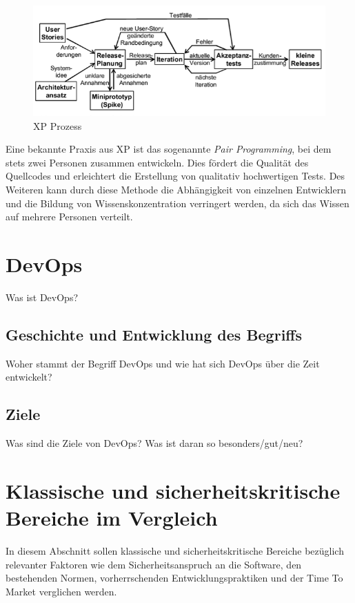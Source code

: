 \begin{figure}
  \centering
  \includegraphics[width=\textwidth]{img/xpmodell.png}
  \caption{XP Prozess \parencite[][S. 46]{Schatten:2010aa}}
  \label{fig:xpmodell}
\end{figure}

Eine bekannte Praxis aus XP ist das sogenannte \emph{Pair Programming}, bei dem stets zwei Personen zusammen entwickeln.
Dies fördert die Qualität des Quellcodes und erleichtert die Erstellung von qualitativ hochwertigen Tests.
Des Weiteren kann durch diese Methode die Abhängigkeit von einzelnen Entwicklern und die Bildung von Wissenskonzentration verringert werden, da sich das Wissen auf mehrere Personen verteilt.

\section{DevOps} %
Was ist DevOps?

\subsection{Geschichte und Entwicklung des Begriffs}
Woher stammt der Begriff DevOps und wie hat sich DevOps über die Zeit entwickelt?

\subsection{Ziele}
Was sind die Ziele von DevOps? Was ist daran so besonders/gut/neu?

\section{Klassische und sicherheitskritische Bereiche im Vergleich} \label{sec:bereiche} %

In diesem Abschnitt sollen klassische und sicherheitskritische Bereiche bezüglich relevanter Faktoren wie dem Sicherheitsanspruch an die Software, den bestehenden Normen, vorherrschenden Entwicklungspraktiken und der Time To Market verglichen werden.

